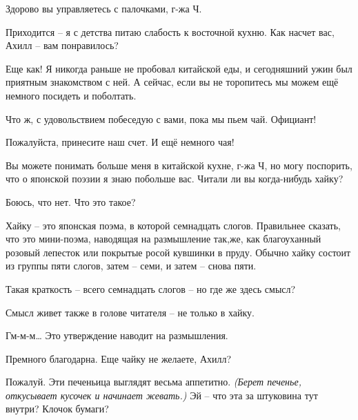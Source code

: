 \documentclass[../main.tex]{subfiles}
\begin{document}


\begin{dialogue}

 Здорово вы управляетесь с палочками, г-жа Ч\@.

 Приходится \--- я с детства питаю слабость к восточной кухню. Как насчет вас, Ахилл \--- вам понравилось?

 Еще как! Я никогда раньше не пробовал китайской еды, и сегодняшний ужин был приятным знакомством с ней. А сейчас, если вы не торопитесь мы можем ещё немного посидеть и поболтать.

 Что ж, с удовольствием побеседую с вами, пока мы пьем чай. Официант!


Пожалуйста, принесите наш счет. И ещё немного чая!


 Вы можете понимать больше меня в китайской кухне, г-жа Ч, но могу поспорить, что о японской поэзии я знаю побольше вас. Читали ли вы когда-нибудь хайку?

 Боюсь, что нет. Что это такое?

 Хайку \--- это японская поэма, в которой семнадцать слогов. Правильнее сказать, что это мини-поэма, наводящая на размышление так,же, как благоуханный розовый лепесток или покрытые росой кувшинки в пруду. Обычно хайку состоит из группы пяти слогов, затем \--- семи, и затем \--- снова пяти.

 Такая краткость \--- всего семнадцать слогов \--- но где же здесь смысл?

 Смысл живет также в голове читателя \--- не только в хайку.

 Гм-м-м\ldots{} Это утверждение наводит на размышления.


Премного благодарна. Еще чайку не желаете, Ахилл?

 Пожалуй. Эти печеньица выглядят весьма аппетитно. \emph{(Берет печенье, откусывает кусочек и начинает жевать.)} Эй \--- что эта за штуковина тут внутри? Клочок бумаги?


\end{dialogue}
\end{document}
